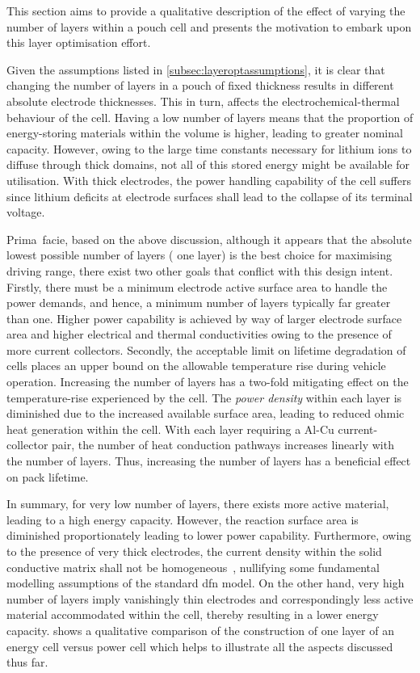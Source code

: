 This section aims to provide a  qualitative description of the effect of varying
the number of layers  within a pouch cell and presents  the motivation to embark
upon this layer optimisation effort.

Given the  assumptions listed in \cref{subsec:layeroptassumptions},  it is clear
that  changing the  number  of layers  in  a pouch  of  fixed thickness  results
in  different  absolute  electrode  thicknesses.   This  in  turn,  affects  the
electrochemical-thermal behaviour  of the  cell. Having a  low number  of layers
means  that the  proportion of  energy-storing  materials within  the volume  is
higher, leading  to greater nominal capacity.  However, owing to the  large time
constants necessary for  lithium ions to diffuse through thick  domains, not all
of this stored energy might be available for utilisation. With thick electrodes,
the power  handling capability  of the  cell suffers  since lithium  deficits at
electrode surfaces shall lead to the collapse of its terminal voltage.

Prima~facie,  based  on the  above  discussion,  although  it appears  that  the
absolute lowest possible  number of layers (\ie{} one layer)  is the best choice
for maximising  driving range, there  exist two  other goals that  conflict with
this design  intent. Firstly, there must  be a minimum electrode  active surface
area  to  handle the  power  demands,  and hence,  a  minimum  number of  layers
typically far  greater than one. Higher  power capability is achieved  by way of
larger electrode surface  area and higher electrical  and thermal conductivities
owing to the presence of more current collectors. Secondly, the acceptable limit
on  lifetime  degradation of  cells  places  an  upper  bound on  the  allowable
temperature rise during vehicle operation. Increasing the number of layers has a
two-fold mitigating effect on the  temperature-rise experienced by the cell. The
\emph{power  density} within  each  layer  is diminished  due  to the  increased
available  surface area,  leading to  reduced ohmic  heat generation  within the
cell. With  each layer requiring a  Al-Cu current-collector pair, the  number of
heat conduction  pathways increases  linearly with the  number of  layers. Thus,
increasing the number of layers has a beneficial effect on pack lifetime.


In summary,  for very low number  of layers, there exists  more active material,
leading  to a  high  energy  capacity. However,  the  reaction  surface area  is
diminished proportionately leading to lower power capability. Furthermore, owing
to the presence  of very thick electrodes, the current  density within the solid
conductive  matrix shall  not  be  homogeneous~\cite{Pals1995}, nullifying  some
fundamental modelling assumptions of the  standard \gls{dfn} model. On the other
hand,  very  high  number  of  layers  imply  vanishingly  thin  electrodes  and
correspondingly  less  active material  accommodated  within  the cell,  thereby
resulting  in  a lower  energy  capacity.   shows  a
qualitative comparison of the construction of one layer of an energy cell versus
power cell which helps to illustrate all the aspects discussed thus far.

